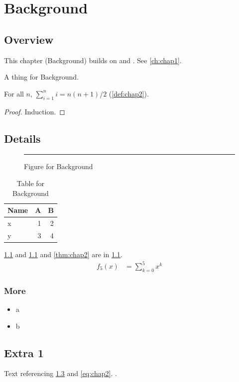 \chapter{Background}\label{ch:chap2}
\section{Overview}\label{sec:chap2:o}
This chapter (Background) builds on \citet{knuth84} and \citep{cousot77,lamport94}. See \cref{ch:chap1}.
\begin{definition}\label{def:chap2}A thing for Background.\end{definition}
\begin{theorem}\label{thm:chap2}For all $n$, $\sum_{i=1}^n i = n(n+1)/2$ (\cref{def:chap2}).\end{theorem}
\begin{proof}Induction.\end{proof}
\section{Details}
\begin{figure}[ht]\centering\rule{5cm}{3cm}\caption{Figure for Background}\label{fig:chap2}\end{figure}
\begin{table}[ht]\centering\caption{Table for Background}\label{tab:chap2}\begin{tabular}{lrr}\toprule Name&A&B\\\midrule x&1&2\\ y&3&4\\\bottomrule\end{tabular}\end{table}
\cref{fig:chap2} and \cref{tab:chap2} and \cref{thm:chap2} are in \cref{sec:chap2:o}.
\begin{align}f_{5}(x)&=\sum_{k=0}^{5}x^k\label{eq:chap2}\end{align}
\subsection{More}\begin{itemize}\item a\item b\end{itemize}
\section{Extra 1}\label{sec:x1}Text referencing \cref{sec:x1} and \cref{eq:chap2}. \citet{turing36}.
